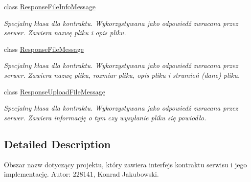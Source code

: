 \begin{DoxyCompactItemize}
class \hyperlink{class_wcf_stream_service_contract_1_1_response_file_info_message}{Response\+File\+Info\+Message}
\begin{DoxyCompactList}\small\item\em Specjalny klasa dla kontraktu. Wykorzystywana jako odpowiedź zwracana przez serwer. Zawiera nazwę pliku i opis pliku. \end{DoxyCompactList}\item 
class \hyperlink{class_wcf_stream_service_contract_1_1_response_file_message}{Response\+File\+Message}
\begin{DoxyCompactList}\small\item\em Specjalny klasa dla kontraktu. Wykorzystywana jako odpowiedź zwracana przez serwer. Zawiera nazwę pliku, rozmiar pliku, opis pliku i strumień (dane) pliku. \end{DoxyCompactList}\item 
class \hyperlink{class_wcf_stream_service_contract_1_1_response_upload_file_message}{Response\+Upload\+File\+Message}
\begin{DoxyCompactList}\small\item\em Specjalny klasa dla kontraktu. Wykorzystywana jako odpowiedź zwracana przez serwer. Zawiera informację o tym czy wysyłanie pliku się powiodło. \end{DoxyCompactList}\end{DoxyCompactItemize}


\subsection{Detailed Description}
Obszar nazw dotyczący projektu, który zawiera interfejs kontraktu serwisu i jego implementację. Autor\+: 228141, Konrad Jakubowski. 

